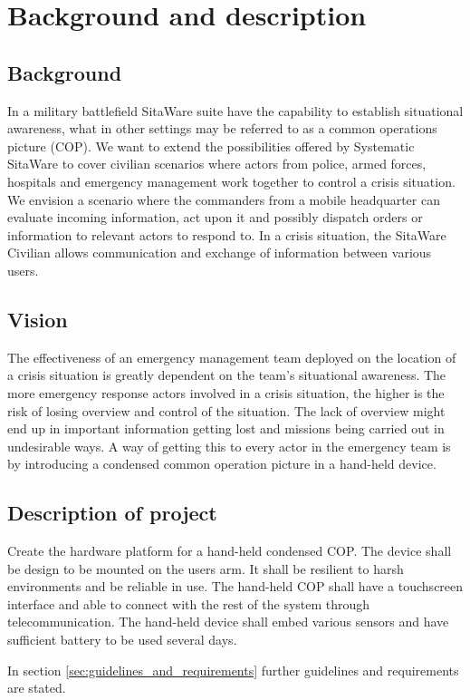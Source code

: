\chapter{Background and description}
\section{Background}
In a military battlefield SitaWare suite have the capability to establish situational awareness, what
in other settings may be referred to as a common operations picture (COP). We want to
extend the possibilities offered by Systematic SitaWare to cover civilian scenarios where
actors from police, armed forces, hospitals and emergency management work together to
control a crisis situation. We envision a scenario where the commanders from a mobile
headquarter can evaluate incoming information, act upon it and possibly dispatch orders
or information to relevant actors to respond to.
In a crisis situation, the SitaWare Civilian allows communication and exchange of information between various users. 

\section{Vision}
The effectiveness of an emergency management team deployed on the location of a crisis
situation is greatly dependent on the team’s situational awareness. The more emergency
response actors involved in a crisis situation, the higher is the risk of losing overview and
control of the situation. The lack of overview might end up in important information
getting lost and missions being carried out in undesirable ways.
A way of getting this to every actor in the emergency team is by introducing a condensed common operation picture in a hand-held device. 

\section{Description of project}
Create the hardware platform for a hand-held condensed COP. The device shall be design to be mounted on the users arm. It shall be resilient to harsh environments and be reliable in use. The hand-held COP shall have a touchscreen interface and able to connect with the rest of the system through telecommunication.
The hand-held device shall embed various sensors and have sufficient battery to be used several days. 

In section \ref{sec:guidelines_and_requirements} further guidelines and requirements are stated. 

